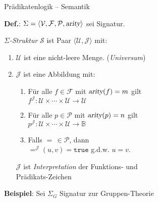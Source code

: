 \documentclass{slides}
\newcommand{\struct}{\mathcal{S}}
\begin{document}
\begin{slide}{}
\normalsize
\begin{center}
Pr\"{a}dikatenlogik -- Semantik
\end{center}
\vspace*{0.5cm}

\footnotesize
\textbf{Def.}:   $\Sigma = \langle \mathcal{V}, \mathcal{F}, \mathcal{P},\textsl{arity}\rangle$ sei Signatur. 

\emph{$\Sigma$-Struktur} $\struct$ ist Paar 
 $\langle \mathcal{U}, \mathcal{J} \rangle$ mit:
\begin{enumerate}
    \item $\mathcal{U}$ ist eine nicht-leere Menge. (\emph{Universum})
    \item $\mathcal{J}$ ist eine Abbildung mit:
    \begin{enumerate}
    \item F\"{u}r alle $f \in \mathcal{F}$ mit $\textsl{arity}(f) = m$ gilt \\[0.3cm]
          \hspace*{1.3cm}
          $f^\mathcal{J}\colon \mathcal{U} \times \cdots \times \mathcal{U} \rightarrow \mathcal{U}$ 
    \item F\"{u}r alle $p \in \mathcal{P}$ mit $\textsl{arity}(p) = n$ gilt \\[0.3cm]
          \hspace*{1.3cm} 
          $p^\mathcal{J}\colon \mathcal{U} \times \cdots \times \mathcal{U} \rightarrow \mathbb{B}$
    \item Falls  $=\,\in\mathcal{P}$, dann \\[0.1cm]
          \hspace*{1.3cm}  $=^\mathcal{J}(u,v) = \mathtt{true}$ \quad g.d.w. \quad $u = v$. \\[0.1cm]
    \end{enumerate}
    $\mathcal{J}$ ist \emph{Interpretation} der Funktions- und \\[0.1cm]
    \hspace*{0.6cm} Pr\"{a}dikats-Zeichen
\end{enumerate}

\textbf{Beispiel}: Sei $\Sigma_G$ Signatur zur Gruppen-Theorie


\end{slide}
\end{document}
